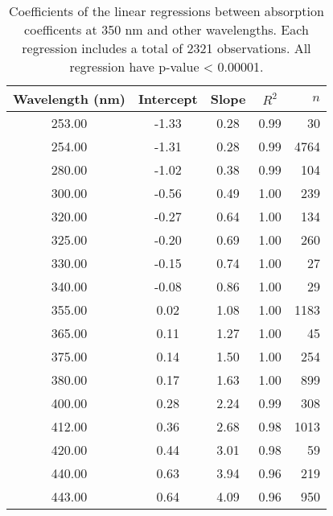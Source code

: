 \begin{table}[ht]
\centering
\begin{tabular}{ccccr}
  \hline
Wavelength (nm) & Intercept & Slope & $R^2$ & $n$ \\ 
  \hline
253.00 & -1.33 & 0.28 & 0.99 &  30 \\ 
  254.00 & -1.31 & 0.28 & 0.99 & 4764 \\ 
  280.00 & -1.02 & 0.38 & 0.99 & 104 \\ 
  300.00 & -0.56 & 0.49 & 1.00 & 239 \\ 
  320.00 & -0.27 & 0.64 & 1.00 & 134 \\ 
  325.00 & -0.20 & 0.69 & 1.00 & 260 \\ 
  330.00 & -0.15 & 0.74 & 1.00 &  27 \\ 
  340.00 & -0.08 & 0.86 & 1.00 &  29 \\ 
  355.00 & 0.02 & 1.08 & 1.00 & 1183 \\ 
  365.00 & 0.11 & 1.27 & 1.00 &  45 \\ 
  375.00 & 0.14 & 1.50 & 1.00 & 254 \\ 
  380.00 & 0.17 & 1.63 & 1.00 & 899 \\ 
  400.00 & 0.28 & 2.24 & 0.99 & 308 \\ 
  412.00 & 0.36 & 2.68 & 0.98 & 1013 \\ 
  420.00 & 0.44 & 3.01 & 0.98 &  59 \\ 
  440.00 & 0.63 & 3.94 & 0.96 & 219 \\ 
  443.00 & 0.64 & 4.09 & 0.96 & 950 \\ 
   \hline
\end{tabular}
\caption{Coefficients of the linear regressions between absorption 
coefficents at 350 nm and other wavelengths. Each regression includes a total 
of 2321 observations. All regression have p-value < 0.00001.} 
\end{table}
